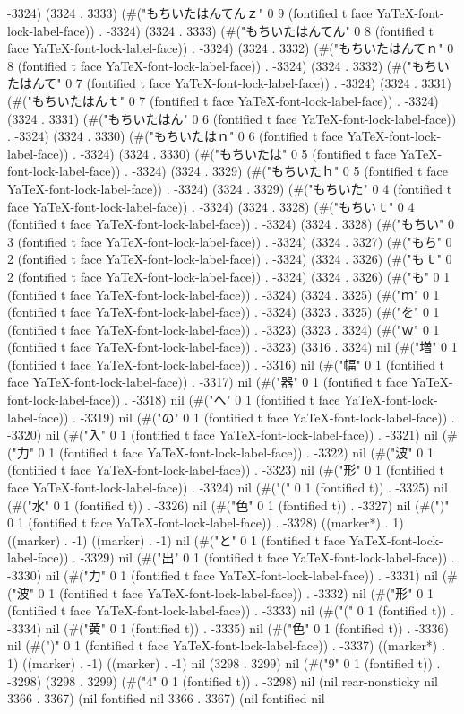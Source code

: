 -3324) (3324 . 3333) (#("もちいたはんてんｚ" 0 9 (fontified t face YaTeX-font-lock-label-face)) . -3324) (3324 . 3333) (#("もちいたはんてん" 0 8 (fontified t face YaTeX-font-lock-label-face)) . -3324) (3324 . 3332) (#("もちいたはんてｎ" 0 8 (fontified t face YaTeX-font-lock-label-face)) . -3324) (3324 . 3332) (#("もちいたはんて" 0 7 (fontified t face YaTeX-font-lock-label-face)) . -3324) (3324 . 3331) (#("もちいたはんｔ" 0 7 (fontified t face YaTeX-font-lock-label-face)) . -3324) (3324 . 3331) (#("もちいたはん" 0 6 (fontified t face YaTeX-font-lock-label-face)) . -3324) (3324 . 3330) (#("もちいたはｎ" 0 6 (fontified t face YaTeX-font-lock-label-face)) . -3324) (3324 . 3330) (#("もちいたは" 0 5 (fontified t face YaTeX-font-lock-label-face)) . -3324) (3324 . 3329) (#("もちいたｈ" 0 5 (fontified t face YaTeX-font-lock-label-face)) . -3324) (3324 . 3329) (#("もちいた" 0 4 (fontified t face YaTeX-font-lock-label-face)) . -3324) (3324 . 3328) (#("もちいｔ" 0 4 (fontified t face YaTeX-font-lock-label-face)) . -3324) (3324 . 3328) (#("もちい" 0 3 (fontified t face YaTeX-font-lock-label-face)) . -3324) (3324 . 3327) (#("もち" 0 2 (fontified t face YaTeX-font-lock-label-face)) . -3324) (3324 . 3326) (#("もｔ" 0 2 (fontified t face YaTeX-font-lock-label-face)) . -3324) (3324 . 3326) (#("も" 0 1 (fontified t face YaTeX-font-lock-label-face)) . -3324) (3324 . 3325) (#("ｍ" 0 1 (fontified t face YaTeX-font-lock-label-face)) . -3324) (3323 . 3325) (#("を" 0 1 (fontified t face YaTeX-font-lock-label-face)) . -3323) (3323 . 3324) (#("ｗ" 0 1 (fontified t face YaTeX-font-lock-label-face)) . -3323) (3316 . 3324) nil (#("増" 0 1 (fontified t face YaTeX-font-lock-label-face)) . -3316) nil (#("幅" 0 1 (fontified t face YaTeX-font-lock-label-face)) . -3317) nil (#("器" 0 1 (fontified t face YaTeX-font-lock-label-face)) . -3318) nil (#("へ" 0 1 (fontified t face YaTeX-font-lock-label-face)) . -3319) nil (#("の" 0 1 (fontified t face YaTeX-font-lock-label-face)) . -3320) nil (#("入" 0 1 (fontified t face YaTeX-font-lock-label-face)) . -3321) nil (#("力" 0 1 (fontified t face YaTeX-font-lock-label-face)) . -3322) nil (#("波" 0 1 (fontified t face YaTeX-font-lock-label-face)) . -3323) nil (#("形" 0 1 (fontified t face YaTeX-font-lock-label-face)) . -3324) nil (#("(" 0 1 (fontified t)) . -3325) nil (#("水" 0 1 (fontified t)) . -3326) nil (#("色" 0 1 (fontified t)) . -3327) nil (#(")" 0 1 (fontified t face YaTeX-font-lock-label-face)) . -3328) ((marker*) . 1) ((marker) . -1) ((marker) . -1) nil (#("と" 0 1 (fontified t face YaTeX-font-lock-label-face)) . -3329) nil (#("出" 0 1 (fontified t face YaTeX-font-lock-label-face)) . -3330) nil (#("力" 0 1 (fontified t face YaTeX-font-lock-label-face)) . -3331) nil (#("波" 0 1 (fontified t face YaTeX-font-lock-label-face)) . -3332) nil (#("形" 0 1 (fontified t face YaTeX-font-lock-label-face)) . -3333) nil (#("(" 0 1 (fontified t)) . -3334) nil (#("黄" 0 1 (fontified t)) . -3335) nil (#("色" 0 1 (fontified t)) . -3336) nil (#(")" 0 1 (fontified t face YaTeX-font-lock-label-face)) . -3337) ((marker*) . 1) ((marker) . -1) ((marker) . -1) nil (3298 . 3299) nil (#("9" 0 1 (fontified t)) . -3298) (3298 . 3299) (#("4" 0 1 (fontified t)) . -3298) nil (nil rear-nonsticky nil 3366 . 3367) (nil fontified nil 3366 . 3367) (nil fontified nil 